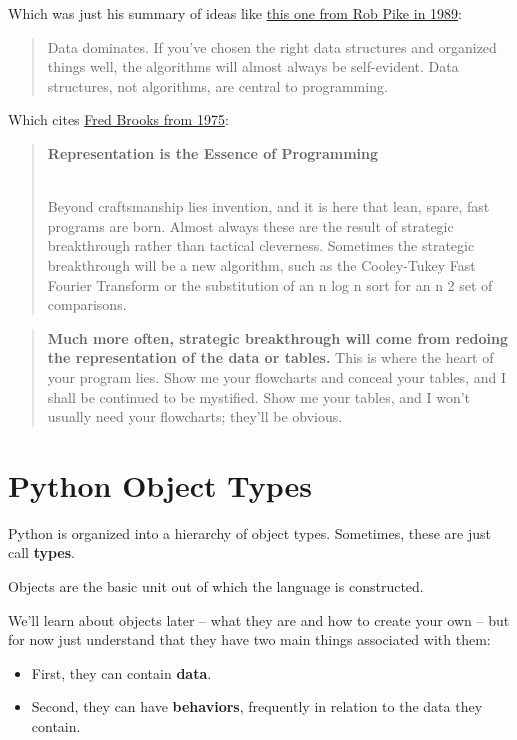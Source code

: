 \documentclass[
  letterpaper,
  DIV=11,
  numbers=noendperiod]{scrreport}
\providecommand{\tightlist}{%
  \setlength{\itemsep}{0pt}\setlength{\parskip}{0pt}}\usepackage{longtable,booktabs,array}
\begin{document}
Which was just his summary of ideas like
\href{http://doc.cat-v.org/bell_labs/pikestyle}{this one from Rob Pike
in 1989}:

\begin{quote}
Data dominates. If you've chosen the right data structures and organized
things well, the algorithms will almost always be self-evident. Data
structures, not algorithms, are central to programming.
\end{quote}

Which cites
\href{https://archive.org/stream/mythicalmanmonth00fred/mythicalmanmonth00fred_djvu.txt}{Fred
Brooks from 1975}:

\begin{quote}
\textbf{Representation is the Essence of Programming}\\
\strut \\
Beyond craftsmanship lies invention, and it is here that lean, spare,
fast programs are born. Almost always these are the result of strategic
breakthrough rather than tactical cleverness. Sometimes the strategic
breakthrough will be a new algorithm, such as the Cooley-Tukey Fast
Fourier Transform or the substitution of an n log n sort for an n 2 set
of comparisons.
\end{quote}

\begin{quote}
\textbf{Much more often, strategic breakthrough will come from redoing
the representation of the data or tables.} This is where the heart of
your program lies. Show me your flowcharts and conceal your tables, and
I shall be continued to be mystified. Show me your tables, and I won't
usually need your flowcharts; they'll be obvious.
\end{quote}

\hypertarget{python-object-types}{%
\chapter{Python Object Types}\label{python-object-types}}

Python is organized into a hierarchy of object types. Sometimes, these
are just call \textbf{types}.

Objects are the basic unit out of which the language is constructed.

We'll learn about objects later -- what they are and how to create your
own -- but for now just understand that they have two main things
associated with them:

\begin{itemize}
\tightlist
\item
  First, they can contain \textbf{data}.
\item
  Second, they can have \textbf{behaviors}, frequently in relation to
  the data they contain.
\end{itemize}
\end{document}

